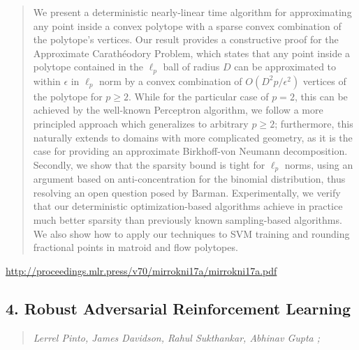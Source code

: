 \documentclass{article}
\begin{document}
\begin{quote}
    We present a deterministic nearly-linear time algorithm for approximating any point inside a convex polytope with a sparse convex combination of the polytope’s vertices. Our result provides a constructive proof for the Approximate Carathéodory Problem, which states that any point inside a polytope contained in the $\ell_p$ ball of radius $D$ can be approximated to within $\epsilon$ in $\ell_p$ norm by a convex combination of $O\left(D^2 p/\epsilon^2\right)$ vertices of the polytope for $p \geq 2$. While for the particular case of $p=2$, this can be achieved by the well-known Perceptron algorithm, we follow a more principled approach which generalizes to arbitrary $p\geq 2$; furthermore, this naturally extends to domains with more complicated geometry, as it is the case for providing an approximate Birkhoff-von Neumann decomposition. Secondly, we show that the sparsity bound is tight for $\ell_p$ norms, using an argument based on anti-concentration for the binomial distribution, thus resolving an open question posed by Barman. Experimentally, we verify that our deterministic optimization-based algorithms achieve in practice much better sparsity than previously known sampling-based algorithms. We also show how to apply our techniques to SVM training and rounding fractional points in matroid and flow polytopes.  
\end{quote}

\href{http://proceedings.mlr.press/v70/mirrokni17a/mirrokni17a.pdf}{http://proceedings.mlr.press/v70/mirrokni17a/mirrokni17a.pdf}

\subsection{4. Robust Adversarial Reinforcement Learning}

\begin{quote}
\footnotesize{\textit{Lerrel Pinto, James Davidson, Rahul Sukthankar, Abhinav Gupta ;}}

\end{quote}
\end{document}
